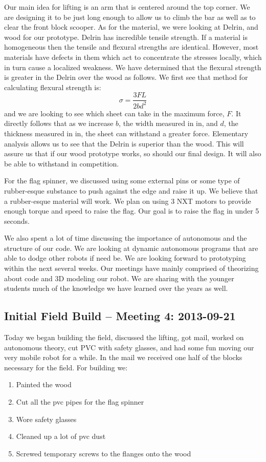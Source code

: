 Our main idea for lifting is an arm that is centered around the top corner. We are designing it to be just long enough to allow us to climb the bar as well as to clear the front block scooper. As for the material, we were looking at Delrin, and wood for our prototype. Delrin has incredible tensile strength. If a material is homogeneous then the tensile and flexural strengths are identical. However, most materials have defects in them which act to concentrate the stresses locally, which in turn cause a localized weakness. We have determined that the flexural strength is greater in the Delrin over the wood as follows. We first see that method for calculating flexural strength is: \[\sigma = \frac{3FL}{2bd^2}\] and we are looking to see which sheet can take in the maximum force, $F$. It directly follows that as we increase $b$, the width measured in in, and $d$, the  thickness measured in in, the sheet can withstand a greater force. Elementary analysis allows us to see that the Delrin is superior than the wood. This will assure us that if our wood prototype works, so should our final design. It will also be able to withstand in competition. 

For the flag spinner, we discussed using some external pins or some type of rubber-esque substance to push against the edge and raise it up. We believe that a rubber-esque material will work. We plan on using 3 NXT motors to provide enough torque and speed to raise the flag. Our goal is to raise the flag in under 5 seconds. 

We also spent a lot of time discussing the importance of autonomous and the structure of our code. We are looking at dynamic autonomous programs that are able to dodge other robots if need be. We are looking forward to prototyping within the next several weeks. Our meetings have mainly comprised of theorizing about code and 3D modeling our robot. We are sharing with the younger students much of the knowledge we have learned over the years as well. 

\newpage \subsection{Initial Field Build -- Meeting 4: 2013-09-21}
Today we began building the field, discussed the lifting, got mail, worked on autonomous theory, cut PVC with safety glasses, and had some fun moving our very mobile robot for a while.  In the mail we received one half of the blocks necessary for the field.
For building we:
\begin{enumerate}
\item Painted the wood
\item Cut all the pvc pipes for the flag spinner
\item Wore safety glasses
\item Cleaned up a lot of pvc dust
\item Screwed temporary screws to the flanges onto the wood
\end{enumerate}


